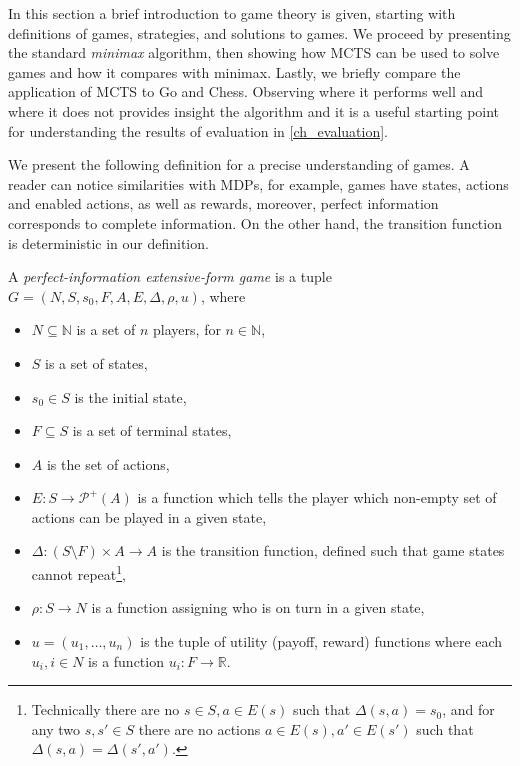 In this section a brief introduction to game theory is given, starting
with definitions of games, strategies, and solutions to games. We
proceed by presenting the standard {\em minimax} algorithm, then showing
how MCTS can be used to solve games and how it compares with minimax.
Lastly, we briefly compare the application of MCTS to Go and Chess.
Observing where it performs well and where it does not provides insight
the algorithm and it is a useful starting point for understanding the results
of evaluation in \autoref{ch_evaluation}.

We present the following definition for a precise understanding of games.
A reader can notice similarities with MDPs, for
example, games have states, actions and enabled actions, as well as
rewards, moreover, perfect information corresponds to complete
information. On the other hand, the transition function is
deterministic in our definition.

\begin{definition}
    A {\em perfect-information extensive-form game}
    is a tuple $G = (N, S, s_0, F, A, E, \Delta, \rho, u)$,
    where
    \begin{itemize}
        \item $N \subseteq \mathbb{N}$ is a set of $n$ players,
            for $n \in \mathbb{N}$,
        \item $S$ is a set of states,
        \item $s_0 \in S$ is the initial state,
        \item $F \subseteq S$ is a set of terminal states,
        \item $A$ is the set of actions,
        \item $E : S \to \mathcal{P}^+(A)$ is a function which tells the player
            which non-empty set of actions can be played in a given state,
        \item $\Delta : (S \setminus F) \times A \to A$ is the
            transition function, defined such that game states cannot
            repeat\footnote{
                Technically there are no $s \in S, a \in E(s)$ such that
                $\Delta(s,a) = s_0$, and for any two $s,s' \in S$ there
                are no actions $a \in E(s), a' \in E(s')$ such that
                $\Delta(s,a) = \Delta(s',a')$.
            },
        \item $\rho : S \to N$ is a function assigning who is on turn in
            a given state, %
        \item $u = (u_1,\ldots,u_{n})$ is the tuple of
            utility (payoff, reward) functions where each $u_i, i \in N$
            is a function $u_i : F \to \mathbb{R}$.
    \end{itemize}
\end{definition}

